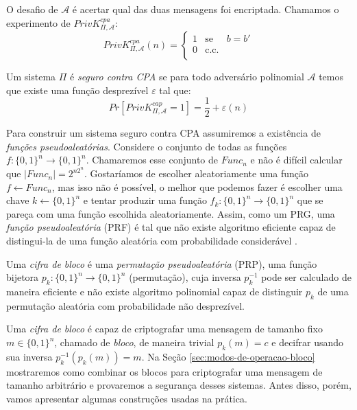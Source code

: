 O desafio de $\mathcal{A}$ é acertar qual das duas mensagens foi encriptada.
Chamamos o experimento de $PrivK^{cpa}_{\Pi, \mathcal{A}}$:
\begin{displaymath}
  PrivK^{cpa}_{\Pi, \mathcal{A}}(n) = \left\{
    \begin{array}{lcl}
      1 & \textrm{se} & b = b'\\
      0 & \textrm{c.c.} &\\
    \end{array}
    \right.
\end{displaymath}

Um sistema $\Pi$ é {\em seguro contra CPA} se para todo adversário polinomial $\mathcal{A}$ temos que existe uma função desprezível $\varepsilon$ tal que:
\begin{displaymath}
  Pr[PrivK^{cap}_{\Pi, \mathcal{A}} = 1] = \frac{1}{2} + \varepsilon(n)
\end{displaymath}

Para construir um sistema seguro contra CPA assumiremos a existência de {\em funções pseudoaleatórias}.
Considere o conjunto de todas as funções $f: \{0,1\}^n \to \{0,1\}^n$.
Chamaremos esse conjunto de $Func_n$ e não é difícil calcular que $|Func_n| = 2^{n2^n}$.
Gostaríamos de escolher aleatoriamente uma função $f \leftarrow Func_n$, mas isso não é possível, o melhor que podemos fazer é escolher uma chave $k \leftarrow \{0,1\}^n$ e tentar produzir uma função $f_k: \{0,1\}^n \to \{0,1\}^n$ que se pareça com uma função escolhida aleatoriamente.
Assim, como um PRG, uma {\em função pseudoaleatória} (PRF) é tal que não existe algoritmo eficiente capaz de distingui-la de uma função aleatória com probabilidade considerável \cite{Goldreich86}.

Uma {\em cifra de bloco} é uma {\em permutação pseudoaleatória} (PRP), uma função bijetora $p_k: \{0,1\}^n \to \{0,1\}^n$ (permutação), cuja inversa $p_k^{-1}$ pode ser calculado de maneira eficiente e não existe algoritmo polinomial capaz de distinguir $p_k$ de uma permutação aleatória com probabilidade não desprezível.

Uma {\em cifra de bloco} é capaz de criptografar uma mensagem de tamanho fixo $m \in \{0,1\}^n$, chamado de {\em bloco}, de maneira trivial $p_k(m) = c$ e decifrar usando sua inversa $p_k^{-1}(p_k(m)) = m$.
Na Seção \ref{sec:modos-de-operacao-bloco} mostraremos como combinar os blocos para criptografar uma mensagem de tamanho arbitrário e provaremos a segurança desses sistemas.
Antes disso, porém, vamos apresentar algumas construções usadas na prática.

